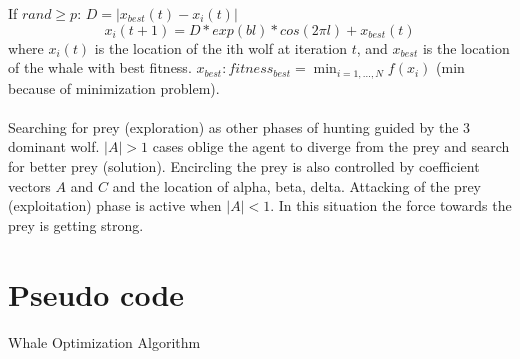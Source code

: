 \documentclass[border=0.2cm]{report}
\begin{document}
If $rand\geq p$:
$D=|x_{best}(t)-x_i(t)|$ \\
\begin{equation}\label{eqn_woa_spiral_step}
x_i(t+1)=D*exp(bl)*cos(2\pi l)+x_{best}(t)
\end{equation}
where $x_i(t)$ is the location of the ith wolf at iteration $t$, and $x_{best}$ is the location of the whale with best fitness. $x_{best}: fitness_{best}=\displaystyle \min_{i=1,\dots, N}f(x_i)$ (min because of minimization problem). \\ \\
Searching for prey (exploration) as other phases of hunting guided by the 3 dominant wolf. $|A|>1$ cases oblige the agent to diverge from the prey and search for better prey (solution). Encircling the prey is also controlled by coefficient vectors $A$ and $C$ and the location of alpha, beta, delta. Attacking of the prey (exploitation) phase is active when $|A|<1$. In this situation the force towards the prey is getting strong.\\

\section{Pseudo code}

\begin{algorithm}[H]
\caption{Whale Optimization Algorithm}
 
\end{algorithm}
\end{document}
